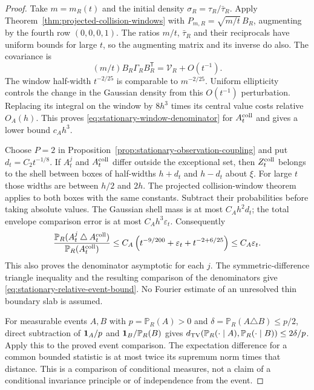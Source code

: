 \begin{proof}
Take $m=m_R(t)$ and the initial density
$\sigma_R=\tau_R/\bar\tau_R$. Apply
Theorem~\ref{thm:projected-collision-windows} with
$P_{m,R}=\sqrt{m/t}\,B_R$, augmenting by the fourth row $(0,0,0,1)$.
The ratios $m/t$, $\bar\tau_R$ and their reciprocals have uniform
bounds for large $t$, so the augmenting matrix and its inverse do
also. The covariance is
\[
 (m/t)B_R\Gamma_RB_R^{\mathsf T}
                         =\mathcal V_R+O(t^{-1}).
\]
The window half-width $t^{-2/25}$ is comparable to $m^{-2/25}$.
Uniform ellipticity controls the change in the Gaussian density from
this $O(t^{-1})$ perturbation. Replacing its integral on the window
by $8h^3$ times its central value costs relative $O_A(h)$.
This proves \eqref{eq:stationary-window-denominator} for
$A_t^{\rm coll}$ and gives a lower bound $c_Ah^3$.

Choose $P=2$ in
Proposition~\ref{prop:stationary-observation-coupling} and put
$d_t=C_2t^{-1/8}$. If $A_t^j$ and $A_t^{\rm coll}$ differ outside
the exceptional set, then $Z_t^{\rm coll}$ belongs to the shell
between boxes of half-widths $h+d_t$ and $h-d_t$ about $\xi$.
For large $t$ those widths are between $h/2$ and $2h$.
The projected collision-window theorem applies to both boxes with
the same constants. Subtract their probabilities before taking
absolute values. The Gaussian shell mass is at most $C_Ah^2d_t$;
the total envelope comparison error is at most $C_Ah^3\varepsilon_t$.
Consequently
\begin{equation}\label{eq:stationary-shell-budget}
 \frac{\mathbb P_R(A_t^j\mathbin\triangle A_t^{\rm coll})}
                         {\mathbb P_R(A_t^{\rm coll})}
 \le C_A\left(t^{-9/200}+\varepsilon_t+t^{-2+6/25}\right)
 \le C_A\varepsilon_t.
\end{equation}
This also proves the denominator asymptotic for each $j$.
The symmetric-difference triangle inequality and the resulting
comparison of the denominators give
\eqref{eq:stationary-relative-event-bound}. No Fourier estimate of
an unresolved thin boundary slab is assumed.

For measurable events $A,B$ with $p=\mathbb P_R(A)>0$ and
$\delta=\mathbb P_R(A\triangle B)\le p/2$, direct subtraction of
$\mathbf1_A/p$ and $\mathbf1_B/\mathbb P_R(B)$ gives
$d_{\rm TV}(\mathbb P_R(\cdot\mid A),\mathbb P_R(\cdot\mid B))
\le2\delta/p$. Apply this to the proved event comparison. The
expectation difference for a common bounded statistic is at most
twice its supremum norm times that distance. This is a comparison
of conditional measures, not a claim of a conditional invariance
principle or of independence from the event.
\end{proof}

